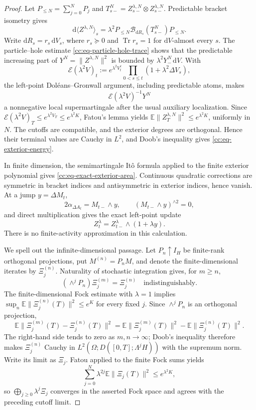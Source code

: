\documentclass[10pt,a4paper]{amsart}
\begin{document}
\begin{proof}
Let \(P_{\leq N}=\sum_{j=0}^NP_j\) and
\(T_{s-}^N=Z_{s-}^{\lambda,N}\otimes Z_{s-}^{\lambda,N}\).  Predictable
bracket isometry gives
\begin{equation}
 \mathrm d\langle Z^{\lambda,N}\rangle_s
 =\lambda^2P_{\leq N}
   \mathcal B_{\mathrm dR_s}(T_{s-}^N)P_{\leq N}.
 \label{cc:eq-exterior-Fock-bracket}
\end{equation}
Write \(\mathrm dR_s=r_s\,\mathrm dV_s\), where
\(r_s\succeq0\) and \(\operatorname{Tr}r_s=1\) for
\(\mathrm dV\)-almost every \(s\).  The particle--hole estimate
\eqref{cc:eq-particle-hole-trace} shows that the predictable increasing
part of \(Y^N=\|Z^{\lambda,N}\|^2\) is bounded by
\(
 \lambda^2Y^N_{-}\,\mathrm dV
\).
With
\[
 \mathcal E(\lambda^2V)_t
 :=e^{\lambda^2V_t^c}
   \prod_{0<s\leq t}(1+\lambda^2\Delta V_s),
\]
the left-point Dol\'eans--Gronwall argument, including predictable atoms,
makes
\[
 \mathcal E(\lambda^2V)^{-1}Y^N
\]
a nonnegative local supermartingale after the usual auxiliary localization.
Since
\(
 \mathcal E(\lambda^2V)_T
 \leq e^{\lambda^2V_T}\leq e^{\lambda^2K}
\), Fatou's lemma yields
\(
 \mathbb E\|Z_T^{\lambda,N}\|^2\leq e^{\lambda^2K}
\), uniformly in \(N\).  The cutoffs are compatible, and the exterior
degrees are orthogonal.  Hence their terminal values are Cauchy in \(L^2\),
and Doob's inequality gives \eqref{cc:eq-exterior-energy}.

In finite dimension, the semimartingale It\^o formula applied to the finite
exterior polynomial gives \eqref{cc:eq-exact-exterior-area}.  Continuous
quadratic corrections are symmetric in bracket indices and antisymmetric in
exterior indices, hence vanish.  At a jump \(y=\Delta M_t\),
\[
 2\alpha_{\Delta A_t}=M_{t-}\wedge y,
 \qquad (M_{t-}\wedge y)^{\wedge2}=0,
\]
and direct multiplication gives the exact left-point update
\[
 Z_t^\lambda=Z_{t-}^\lambda\wedge(1+\lambda y).
\]
There is no finite-activity approximation in this calculation.

We spell out the infinite-dimensional passage.  Let $P_n\uparrow I_H$ be
finite-rank orthogonal projections, put $M^{(n)}=P_nM$, and denote the
finite-dimensional iterates by $\Xi_j^{(n)}$.  Naturality of stochastic
integration gives, for $m\ge n$,
\begin{equation}
 (\wedge^jP_n)\Xi_j^{(m)}=\Xi_j^{(n)}
 \quad\text{indistinguishably}.
 \label{cc:eq-exterior-projection-compatibility}
\end{equation}
The finite-dimensional Fock estimate with $\lambda=1$ implies
$\sup_n\mathbb E\|\Xi_j^{(n)}(T)\|^2\le e^K$ for every fixed $j$.
Since $\wedge^jP_n$ is an orthogonal projection,
\[
 \mathbb E\|\Xi_j^{(m)}(T)-\Xi_j^{(n)}(T)\|^2
 =\mathbb E\|\Xi_j^{(m)}(T)\|^2
  -\mathbb E\|\Xi_j^{(n)}(T)\|^2.
\]
The right-hand side tends to zero as $m,n\to\infty$; Doob's inequality
therefore makes $\Xi_j^{(n)}$ Cauchy in
$L^2(\Omega;D([0,T];\Lambda^jH))$ with the supremum norm.  Write its limit as
$\Xi_j$.  Fatou applied to the finite Fock sums yields
\[
 \sum_{j=0}^N\lambda^{2j}\mathbb E\|\Xi_j(T)\|^2
 \le e^{\lambda^2K},
\]
so $\bigoplus_{j\ge0}\lambda^j\Xi_j$ converges in the asserted Fock space
and agrees with the preceding cutoff limit.


\end{proof}
\end{document}
